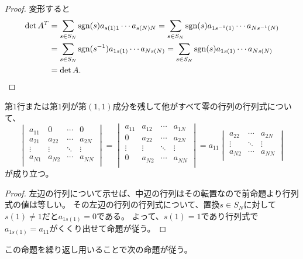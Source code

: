 \begin{proof}
変形すると
$$
\begin{aligned}
\det A^T
&= \sum_{s \in S_N}\operatorname{sgn}(s) a_{s(1) 1}\cdots a_{s(N) N}
= \sum_{s \in S_N}\operatorname{sgn}(s) a_{1 s^{-1}(1)}\cdots a_{N s^{-1}(N)} \\
&= \sum_{s \in S_N}\operatorname{sgn}(s^{-1}) a_{1 s(1)}\cdots a_{N s(N)}
= \sum_{s \in S_N}\operatorname{sgn}(s) a_{1 s(1)}\cdots a_{N s(N)} \\
&= \det A.
\end{aligned}
$$
\end{proof}

\begin{proposition}
第$1$行または第$1$列が第$(1, 1)$成分を残して他がすべて零の行列の行列式について、
$$
\begin{vmatrix}
a_{1 1} & 0       & \cdots & 0      \\
a_{2 1} & a_{2 2} & \cdots & a_{2 N}\\
\vdots  & \vdots  & \ddots & \vdots \\
a_{N 1} & a_{N 2} & \cdots & a_{N N}\\
\end{vmatrix}
=
\begin{vmatrix}
a_{1 1} & a_{1 2} & \cdots & a_{1 N}\\
0       & a_{2 2} & \cdots & a_{2 N}\\
\vdots  & \vdots  & \ddots & \vdots \\
0       & a_{N 2} & \cdots & a_{N N}\\
\end{vmatrix}
=
a_{1 1}
\begin{vmatrix}
a_{2 2} & \cdots & a_{2 N}\\
\vdots  & \ddots & \vdots \\
a_{N 2} & \cdots & a_{N N}\\
\end{vmatrix}
$$
が成り立つ。
\end{proposition}

\begin{proof}
左辺の行列について示せば、中辺の行列はその転置なので前命題より行列式の値は等しい。
その左辺の行列の行列式について、置換$s \in S_N$に対して$s(1) \ne 1$だと$a_{1 s(1)} = 0$である。
よって、$s(1) = 1$であり行列式で$a_{1 s(1)} = a_{1 1}$がくくり出せて命題が従う。
\end{proof}

この命題を繰り返し用いることで次の命題が従う。

